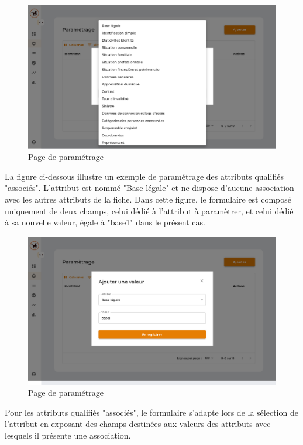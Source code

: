 \begin{figure}[H]
    \includegraphics[width=.7\textwidth, right]{images/guis/parametrage/form-attribute-selection.png}
    \caption{Page de paramétrage}
\end{figure}

\clearpage

\noindent La figure ci-dessous illustre un exemple de paramétrage des attributs qualifiés "associés". L'attribut est nommé "Base légale" et ne dispose d'aucune association avec les autres attributs de la fiche. Dans cette figure, le formulaire est composé uniquement de deux champs, celui dédié à l'attribut à paramètrer, et celui dédié à sa nouvelle valeur, égale à "base1" dans le présent cas. \\

\begin{figure}[H]
    \centering
    \includegraphics[width=\textwidth]{images/guis/parametrage/form-independent-attribute.png}
    \caption{Page de paramétrage}
\end{figure}

\clearpage

\noindent Pour les attributs qualifiés "associés", le formulaire s'adapte lors de la sélection de l'attribut en exposant des champs destinées aux valeurs des attributs avec lesquels il présente une association. \\

